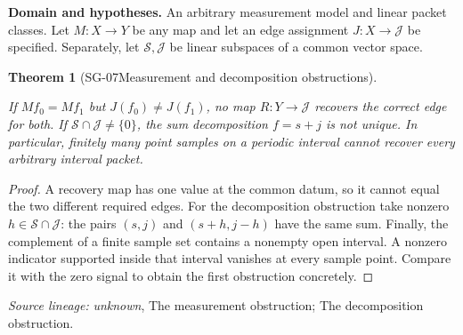 \documentclass[11pt]{article}
\newtheorem{theorem}{Theorem}[section]
\theoremstyle{definition}\newtheorem{definition}[theorem]{Definition}
\theoremstyle{remark}\newtheorem{remark}[theorem]{Remark}
\begin{document}
\par{\small\textbf{Domain and hypotheses.} An arbitrary measurement model and linear packet classes. Let $M:X\to Y$ be any map and let an edge assignment $J:X\to\mathcal J$ be specified. Separately, let $\mathcal S,\mathcal J$ be linear subspaces of a common vector space.}\par
\begin{theorem}[SG-07\quad Measurement and decomposition obstructions]\label{SG-07}

If $Mf_0=Mf_1$ but $J(f_0)\ne J(f_1)$, no map $R:Y\to\mathcal J$ recovers
the correct edge for both. If $\mathcal S\cap\mathcal J\ne\{0\}$, the
sum decomposition $f=s+j$ is not unique. In particular, finitely many point
samples on a periodic interval cannot recover every arbitrary interval packet.

\end{theorem}
\begin{proof}

A recovery map has one value at the common datum, so it cannot equal the two
different required edges. For the decomposition obstruction take nonzero
$h\in\mathcal S\cap\mathcal J$: the pairs $(s,j)$ and $(s+h,j-h)$ have the
same sum. Finally, the complement of a finite sample set contains a nonempty
open interval. A nonzero indicator supported inside that interval vanishes at
every sample point. Compare it with the zero signal to obtain the first
obstruction concretely.

\end{proof}

\par{\small\color{Teal}\textit{Source lineage:} \textit{unknown}, The measurement obstruction; The decomposition obstruction.}\par
\end{document}
